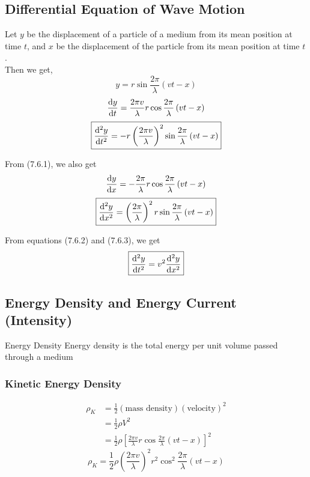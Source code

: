 \documentclass[12pt]{article}
\numberwithin{equation}{subsection}
\begin{document}
\subsection{Differential Equation of Wave Motion}
Let $y$ be the displacement of a particle of a medium from its mean position at time $t$, and $x$ be the displacement of the particle from its mean position at time $t$. \\
Then we get,
\begin{equation}
    y = r \sin{\frac{2\pi}{\lambda}\left( vt - x \right)}
\end{equation}
\begin{equation*}
    \dv{y}{t} = \frac{2\pi v}{\lambda} r \cos{\frac{2\pi}{\lambda}\left( vt - x \right)}
\end{equation*}
\begin{equation}
    \boxed{ \dv[2]{y}{t} = -r \left( \frac{2\pi v}{\lambda} \right)^2 \sin{\frac{2\pi}{\lambda}\left( vt - x \right)} }
\end{equation}

From (7.6.1), we also get
\begin{equation*}
    \dv{y}{x} = - \frac{2\pi}{\lambda} r \cos{\frac{2\pi}{\lambda}\left( vt - x \right)}
\end{equation*}
\begin{equation}
    \boxed{ \dv[2]{y}{x} = \left( \frac{2\pi}{\lambda} \right)^2 r \sin{\frac{2\pi}{\lambda}\left( vt - x \right)} }
\end{equation}

From equations (7.6.2) and (7.6.3), we get
\begin{equation}
    \boxed{ \dv[2]{y}{t} = v^2 \dv[2]{y}{x} }
\end{equation}

\subsection{Energy Density and Energy Current (Intensity)}
\begin{definition}{Energy Density}{}
    Energy density is the total energy per unit volume passed through a medium
\end{definition}

\subsubsection{Kinetic Energy Density}
\begin{align*}
    \rho_K &= \frac{1}{2}(\text{mass density})(\text{velocity})^2 \\
    &= \frac{1}{2} \rho V^2 \\
    &= \frac{1}{2} \rho \left[ \frac{2\pi v}{\lambda} r \cos{\frac{2\pi}{\lambda} (vt - x)} \right]^2
\end{align*}
\begin{equation}
    \boxed{ \rho_K = \frac{1}{2} \rho \left( \frac{2\pi v}{\lambda} \right)^2 r^2 \cos^2{\frac{2\pi}{\lambda} (vt - x)} }
\end{equation}
\end{document}
